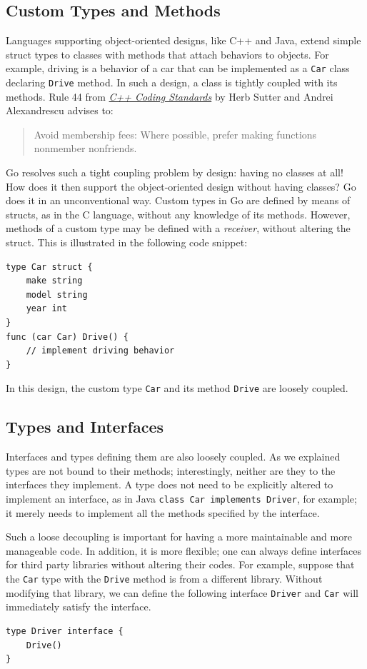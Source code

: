 \documentclass[11pt]{article}
\begin{document}
\subsection{Custom Types and Methods}
\label{sec:orgheadline7}
Languages supporting object-oriented designs, like C++ and Java, extend simple struct types to classes with methods that attach behaviors to objects. For example, driving is a behavior of a car that can be implemented as a \texttt{Car} class declaring \texttt{Drive} method. In such a design, a class is tightly coupled with its methods. Rule 44 from \href{http://www.gotw.ca/publications/c++cs.htm}{\emph{C++ Coding Standards}} by Herb Sutter and Andrei Alexandrescu advises to:
\begin{quote}
Avoid membership fees: Where possible, prefer making functions nonmember nonfriends.
\end{quote}

Go resolves such a tight coupling problem by design: having no classes at all! How does it then support the object-oriented design without having classes? Go does it in an unconventional way. Custom types in Go are defined by means of structs, as in the C language, without any knowledge of its methods. However, methods of a custom type may be defined with a \emph{receiver}, without altering the struct. This is illustrated in the following code snippet:
\begin{verbatim}
type Car struct {
    make string
    model string
    year int
}
func (car Car) Drive() {
    // implement driving behavior
}
\end{verbatim}
In this design, the custom type \texttt{Car} and its method \texttt{Drive} are loosely coupled.

\subsection{Types and Interfaces}
\label{sec:orgheadline8}
Interfaces and types defining them are also loosely coupled. As we explained types are not bound to their methods; interestingly, neither are they to the interfaces they implement. A type does not need to be explicitly altered to implement an interface, as in Java \texttt{class Car implements Driver}, for example; it merely needs to implement all the methods specified by the interface.

Such a loose decoupling is important for having a more maintainable and more manageable code. In addition, it is more flexible; one can always define interfaces for third party libraries without altering their codes. For example, suppose that the \texttt{Car} type with the \texttt{Drive} method is from a different library. Without modifying that library, we can define the following interface \texttt{Driver} and \texttt{Car} will immediately satisfy the interface.
\begin{verbatim}
type Driver interface {
    Drive()
}
\end{verbatim}
\end{document}
